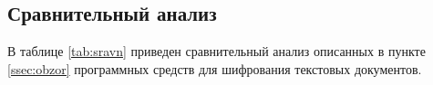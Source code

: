 %
%
%
%
%


\newpage
\subsection{Сравнительный анализ}

В таблице \ref{tab:sravn} приведен сравнительный анализ описанных
в пункте \ref{ssec:obzor} программных средств для шифрования
текстовых документов.


